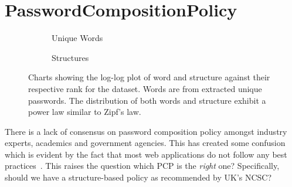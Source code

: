 \vspace*{-0.7cm}
\section{Password\;Composition\;Policy}
\vspace*{-0.4cm}
\label{sec::chp4::pcp}
\begin{figure}[ht]
    \centering
    \begin{subfigure}[b]{0.45\linewidth}
        \centering
        \scalebox{1}{}
        \caption{Unique Words}
        \label{fig:word_freq_loglog}
    \end{subfigure}
    \hspace{0.5cm} %
    \begin{subfigure}[b]{0.45\linewidth}
        \centering
        \scalebox{1}{}
        \caption{Structures}
        \label{fig:structure_loglog}
    \end{subfigure}
    \caption{Charts showing the log-log plot of word and structure against their respective rank for the \hmail dataset. Words are from extracted unique passwords. The distribution of both words and structure exhibit a power law similar to Zipf's law.}
    \label{fig:log-log-charts}
\end{figure}




There is a lack of consensus on password composition policy amongst industry experts, academics and government agencies. This has created some confusion which is evident by the fact that most web applications do not follow any best practices~\cite{alroomi_measuring_2023, lomchan_comparison_2023, lim_evaluating_2023, maoneke_password_2019, furnell_assessing_2011, woo_survey_2018, lee_password_2022, gerlitz_please_2021}. This raises the question which PCP is the \textit{right} one? Specifically, should we have a structure-based policy as recommended by UK's NCSC?

